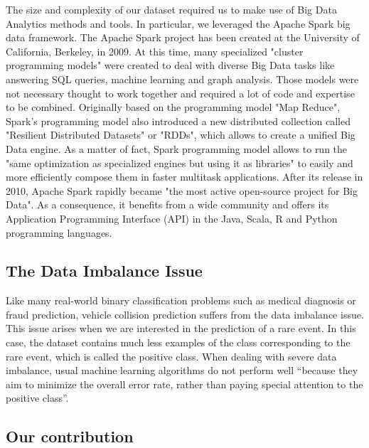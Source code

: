 \documentclass[conference]{IEEEtran}
\begin{document}
The size and complexity of our dataset required us to make use of Big Data Analytics methods and tools. In particular, we leveraged the Apache Spark\cite{spark} big data framework. The Apache Spark project has been created at the University of California, Berkeley, in 2009. At this time, many specialized "cluster programming models" were created to deal with diverse Big Data tasks like answering SQL queries, machine learning and graph analysis\cite{spark}. Those models were not necessary thought to work together and required a lot of code and expertise to be combined. Originally based on the programming model "Map Reduce"\cite{mapreduce}, Spark's programming model also introduced a new distributed collection called "Resilient Distributed Datasets" or "RDDs", which allows to create a unified Big Data engine. As a matter of fact, Spark programming model allows to run the "same optimization as specialized engines but using it as libraries" to easily and more efficiently compose them in faster multitask applications. After its release in 2010, Apache Spark rapidly became "the most active open-source project for Big Data"\cite{spark}. As a consequence, it benefits from a wide community and offers its Application Programming Interface (API) in the Java, Scala, R and Python programming languages. 

\subsection{The Data Imbalance Issue}

Like many real-world binary classification problems such as medical diagnosis or fraud prediction, vehicle collision prediction suffers from the data imbalance issue. This issue arises when we are interested in the prediction of a rare event. In this case, the dataset contains much less examples of the class corresponding to the rare event, which is called the positive class. When dealing with severe data imbalance, usual machine learning algorithms do not perform well ``because they aim to minimize the overall error rate, rather than paying special attention to the positive class''\cite{Chen2004}. 

\subsection{Our contribution}
\end{document}
